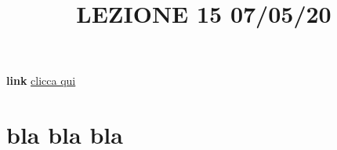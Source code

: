 \title{LEZIONE 15 07/05/20}
\textbf{link} \href{https://web.microsoftstream.com/video/cc735a4e-c7cb-467d-97bd-910450c2d0a3?list=user&userId=cfe0965d-9a7c-40e2-be6e-f078296a1914}{clicca qui}
\section{bla bla bla}